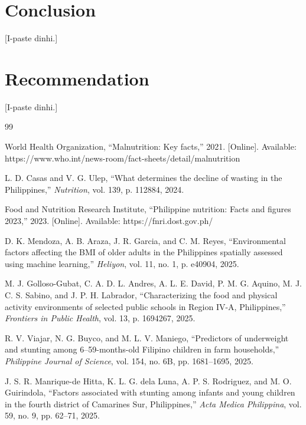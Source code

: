 \documentclass[12pt, a4paper]{report}
\begin{document}
\section{Conclusion}
\label{sec:conclusion}
[I-paste dinhi.]

\section{Recommendation}
\label{sec:recommendation}
[I-paste dinhi.]

\clearpage

\renewcommand{\bibname}{REFERENCES}

\begin{thebibliography}{99}

World Health Organization, ``Malnutrition: Key facts,'' 2021. [Online]. Available: https://www.who.int/news-room/fact-sheets/detail/malnutrition

L. D. Casas and V. G. Ulep, ``What determines the decline of wasting in the Philippines,'' \textit{Nutrition}, vol. 139, p. 112884, 2024.

Food and Nutrition Research Institute, ``Philippine nutrition: Facts and figures 2023,'' 2023. [Online]. Available: https://fnri.dost.gov.ph/

D. K. Mendoza, A. B. Araza, J. R. Garcia, and C. M. Reyes, ``Environmental factors affecting the BMI of older adults in the Philippines spatially assessed using machine learning,'' \textit{Heliyon}, vol. 11, no. 1, p. e40904, 2025.

M. J. Golloso-Gubat, C. A. D. L. Andres, A. L. E. David, P. M. G. Aquino, M. J. C. S. Sabino, and J. P. H. Labrador, ``Characterizing the food and physical activity environments of selected public schools in Region IV-A, Philippines,'' \textit{Frontiers in Public Health}, vol. 13, p. 1694267, 2025.

R. V. Viajar, N. G. Buyco, and M. L. V. Maniego, ``Predictors of underweight and stunting among 6--59-months-old Filipino children in farm households,'' \textit{Philippine Journal of Science}, vol. 154, no. 6B, pp. 1681--1695, 2025.

J. S. R. Manrique-de Hitta, K. L. G. dela Luna, A. P. S. Rodriguez, and M. O. Guirindola, ``Factors associated with stunting among infants and young children in the fourth district of Camarines Sur, Philippines,'' \textit{Acta Medica Philippina}, vol. 59, no. 9, pp. 62--71, 2025.


\end{thebibliography}
\end{document}
